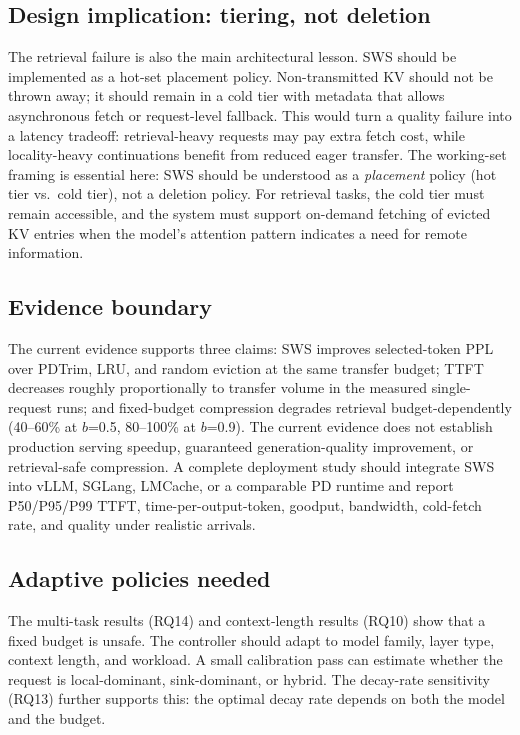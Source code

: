 \documentclass[11pt]{article}
\newcommand{\method}{SWS}
\newcommand{\sws}{SWS}
\newcommand{\pct}{\%}
\theoremstyle{definition}
\theoremstyle{plain}
\begin{document}
\subsection{Design implication: tiering, not deletion}
The retrieval failure is also the main architectural lesson.  \sws{} should be implemented as a hot-set placement policy.  Non-transmitted KV should not be thrown away; it should remain in a cold tier with metadata that allows asynchronous fetch or request-level fallback.  This would turn a quality failure into a latency tradeoff: retrieval-heavy requests may pay extra fetch cost, while locality-heavy continuations benefit from reduced eager transfer.  The working-set framing is essential here: \sws{} should be understood as a \emph{placement} policy (hot tier vs.\ cold tier), not a deletion policy.  For retrieval tasks, the cold tier must remain accessible, and the system must support on-demand fetching of evicted KV entries when the model's attention pattern indicates a need for remote information.

\subsection{Evidence boundary}
The current evidence supports three claims: \method{} improves selected-token PPL over PDTrim, LRU, and random eviction at the same transfer budget; TTFT decreases roughly proportionally to transfer volume in the measured single-request runs; and fixed-budget compression degrades retrieval budget-dependently (40--60\pct{} at $b$=0.5, 80--100\pct{} at $b$=0.9).  The current evidence does not establish production serving speedup, guaranteed generation-quality improvement, or retrieval-safe compression.  A complete deployment study should integrate \method{} into vLLM, SGLang, LMCache, or a comparable PD runtime and report P50/P95/P99 TTFT, time-per-output-token, goodput, bandwidth, cold-fetch rate, and quality under realistic arrivals.

\subsection{Adaptive policies needed}
The multi-task results (RQ14) and context-length results (RQ10) show that a fixed budget is unsafe.  The controller should adapt to model family, layer type, context length, and workload.  A small calibration pass can estimate whether the request is local-dominant, sink-dominant, or hybrid.  The decay-rate sensitivity (RQ13) further supports this: the optimal decay rate depends on both the model and the budget.
\end{document}
